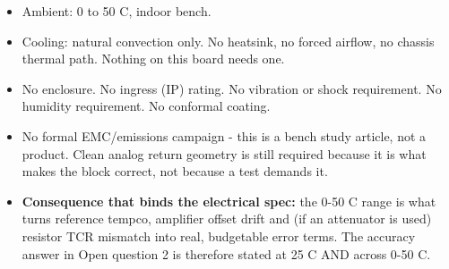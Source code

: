 \documentclass[11pt,a4paper]{article}
\begin{document}
\begin{itemize}
\item Ambient: 0 to 50 C, indoor bench.
\item Cooling: natural convection only. No heatsink, no forced airflow, no chassis
thermal path. Nothing on this board needs one.
\item No enclosure. No ingress (IP) rating. No vibration or shock requirement. No
humidity requirement. No conformal coating.
\item No formal EMC/emissions campaign - this is a bench study article, not a
product. Clean analog return geometry is still required because it is what
makes the block correct, not because a test demands it.
\item \textbf{Consequence that binds the electrical spec:} the 0-50 C range is what
turns reference tempco, amplifier offset drift and (if an attenuator is
used) resistor TCR mismatch into real, budgetable error terms. The accuracy
answer in Open question 2 is therefore stated at 25 C AND across 0-50 C.
\end{itemize}
\end{document}
